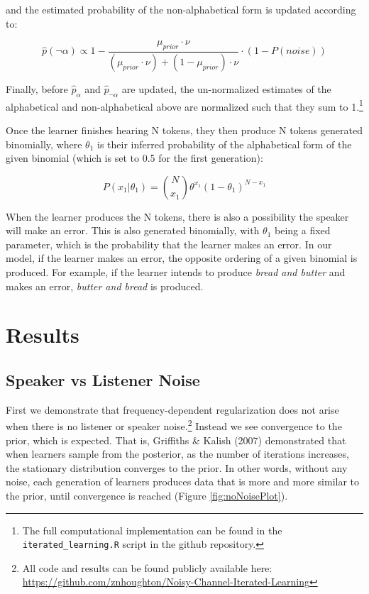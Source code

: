 \documentclass[10pt, letterpaper]{article}
\begin{document}
and the estimated probability of the non-alphabetical form is updated
according to:

\begin{equation}
\label{eq:phatNonalpha2}
\hat{p}(\neg\alpha) \propto 1 - \frac{\mu_{prior} \cdot \nu}{(\mu_{prior} \cdot \nu) + (1 - \mu_{prior}) \cdot \nu} \cdot (1-P(noise)) 
\end{equation}

Finally, before \(\hat{p}_\alpha\) and \(\hat{p}_{\neg\alpha}\) are
updated, the un-normalized estimates of the alphabetical and
non-alphabetical above are normalized such that they sum to
1.\footnote{The full computational implementation can be found in the
  \texttt{iterated\_learning.R} script in the github repository.}

Once the learner finishes hearing N tokens, they then produce N tokens
generated binomially, where \(\theta_1\) is their inferred probability
of the alphabetical form of the given binomial (which is set to 0.5 for
the first generation):

\begin{equation}
\label{eq:binomialProd}
P(x_1|\theta_1) = \binom{N}{x_1} \theta^{x_1} (1-\theta_1)^{N-x_1}
\end{equation}

When the learner produces the N tokens, there is also a possibility the
speaker will make an error. This is also generated binomially, with
\(\theta_1\) being a fixed parameter, which is the probability that the
learner makes an error. In our model, if the learner makes an error, the
opposite ordering of a given binomial is produced. For example, if the
learner intends to produce \emph{bread and butter} and makes an error,
\emph{butter and bread} is produced.

\hypertarget{results}{%
\section{Results}\label{results}}

\hypertarget{speaker-vs-listener-noise}{%
\subsection{Speaker vs Listener Noise}\label{speaker-vs-listener-noise}}

First we demonstrate that frequency-dependent regularization does not
arise when there is no listener or speaker noise.\footnote{All code and
  results can be found publicly available here:
  \url{https://github.com/znhoughton/Noisy-Channel-Iterated-Learning}}
Instead we see convergence to the prior, which is expected. That is,
Griffiths \& Kalish (2007) demonstrated that when learners sample from
the posterior, as the number of iterations increases, the stationary
distribution converges to the prior. In other words, without any noise,
each generation of learners produces data that is more and more similar
to the prior, until convergence is reached (Figure
\ref{fig:noNoisePlot}).
\end{document}
